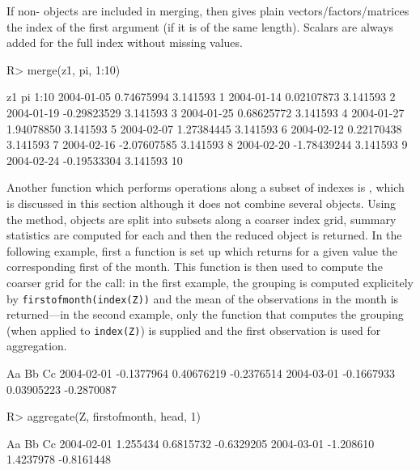 \documentclass[article,nojss]{jss}
\begin{document}
If non- objects are included in merging,
then  gives plain vectors/factors/matrices the index of the
first argument (if it is of the same length). Scalars are always added for
the full index without missing values.

\begin{Schunk}
\begin{Sinput}
R> merge(z1, pi, 1:10)
\end{Sinput}
\begin{Soutput}
                    z1       pi 1:10
2004-01-05  0.74675994 3.141593    1
2004-01-14  0.02107873 3.141593    2
2004-01-19 -0.29823529 3.141593    3
2004-01-25  0.68625772 3.141593    4
2004-01-27  1.94078850 3.141593    5
2004-02-07  1.27384445 3.141593    6
2004-02-12  0.22170438 3.141593    7
2004-02-16 -2.07607585 3.141593    8
2004-02-20 -1.78439244 3.141593    9
2004-02-24 -0.19533304 3.141593   10
\end{Soutput}
\end{Schunk}

Another function which performs operations along a subset of indexes
is , which is discussed in this section although
it does not combine several objects. Using the  method,  objects
are split into subsets along a coarser index grid,
summary statistics are computed for each and then the 
reduced object is returned. In the following example,
first a function is set up which returns for a given 
value the corresponding first of the month. This function is then
used to compute the coarser grid for the  call: in
the first example, the grouping is computed explicitely by \verb/firstofmonth(index(Z))/
and the mean of the observations in the month
is returned---in the second example, only the function that computes 
the grouping (when applied to \verb/index(Z)/) is supplied and
the first observation is used for aggregation.

\begin{Schunk}
\begin{Soutput}
                   Aa         Bb         Cc
2004-02-01 -0.1377964 0.40676219 -0.2376514
2004-03-01 -0.1667933 0.03905223 -0.2870087
\end{Soutput}
\begin{Sinput}
R> aggregate(Z, firstofmonth, head, 1)
\end{Sinput}
\begin{Soutput}
                  Aa        Bb         Cc
2004-02-01  1.255434 0.6815732 -0.6329205
2004-03-01 -1.208610 1.4237978 -0.8161448
\end{Soutput}
\end{Schunk}
\end{document}
